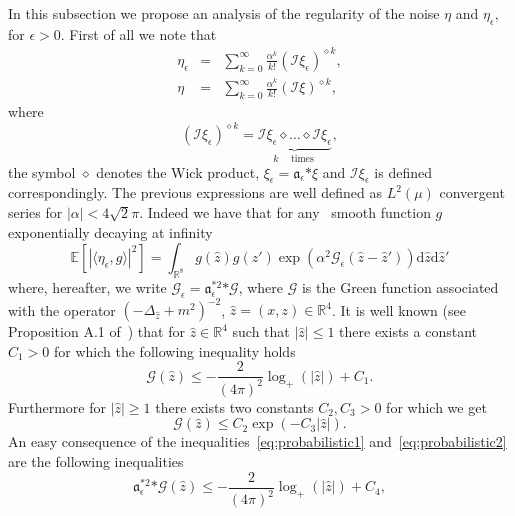 \documentclass[a4paper,10pt]{article}
\newcommand{\asterisk}{\mathord{*}}
\newcommand{\mathd}{\mathrm{d}}
\newcommand{\tmop}[1]{\ensuremath{\operatorname{#1}}}
\begin{document}
In this subsection we propose an analysis of the regularity of the noise
$\eta$ and $\eta_{\epsilon}$, for $\epsilon > 0$. First of all we note that
\begin{eqnarray}
  \eta_{\epsilon} & = & \sum_{k = 0}^{\infty} \frac{\alpha^k}{k!} (\mathcal{I}
  \xi_{\epsilon})^{\diamond k},  \label{eq:noise1}\\
  \eta & = & \sum_{k = 0}^{\infty} \frac{\alpha^k}{k!} (\mathcal{I}
  \xi)^{\diamond k},  \label{eq:noise2}
\end{eqnarray}
where
\[ (\mathcal{I} \xi_{\epsilon})^{\diamond k} = \underbrace{\mathcal{I}
   \xi_{\epsilon} \diamond \ldots \diamond \mathcal{I} \xi_{\epsilon}}_{k
   \quad \tmop{times}} {}^{}, \]
the symbol $\diamond$ denotes the Wick product, $\xi_{\epsilon} =
\mathfrak{a}_{\epsilon} \asterisk \xi$ and $\mathcal{I} \xi_{\epsilon}$ is
defined correspondingly. The previous expressions are well defined as $L^2
(\mu)$ convergent series for $| \alpha | < 4 \sqrt{2} \pi$. Indeed we have
that for any \ smooth function $g$ exponentially decaying at infinity \
\begin{equation}
  \mathbb{E} [| \langle \eta_{\epsilon}, g \rangle |^2] = \int_{\mathbb{R}^8}
  g (\hat{z}) g (\hat{z}') \exp (\alpha^2 \mathcal{G}_{\epsilon} (\hat{z} -
  \hat{z}')) \mathd \hat{z} \mathd \hat{z}' \label{eq:noise3}
\end{equation}
where, hereafter, we write $\mathcal{G}_{\epsilon} = \mathfrak{a}^{\asterisk
2}_{\epsilon} \asterisk \mathcal{G}$, where $\mathcal{G}$ is the Green
function associated with the operator $(- \Delta_{\hat{z}} + m^2)^{- 2}$,
$\hat{z} = (x, z) \in \mathbb{R}^4$. It is well known (see Proposition A.1
of~{\cite{Albeverio2002}}) that for $\hat{z} \in \mathbb{R}^4$ such that $|
\hat{z} | \leqslant 1$ there exists a constant $C_1 > 0$ for which the
following inequality holds
\begin{equation}
  \mathcal{G} (\hat{z}) \leqslant - \frac{2}{(4 \pi)^2} \log_+ (| \hat{z} |) +
  C_1 \label{eq:probabilistic1} .
\end{equation}
Furthermore for $| \hat{z} | \geqslant 1$ there exists two constants $C_2, C_3
> 0$ for which we get
\begin{equation}
  \mathcal{G} (\hat{z}) \leqslant C_2 \exp (- C_3 | \hat{z} |)
  \label{eq:probabilistic2} .
\end{equation}
An easy consequence of the inequalities~{\eqref{eq:probabilistic1}}
and~{\eqref{eq:probabilistic2}} are the following inequalities
\begin{equation}
  \mathfrak{a}_{\epsilon}^{\asterisk 2} \asterisk \mathcal{G} (\hat{z})
  \leqslant - \frac{2}{(4 \pi)^2} \log_+ (| \hat{z} |) + C_4,
  \label{eq:probabilistic3}
\end{equation}
\end{document}
